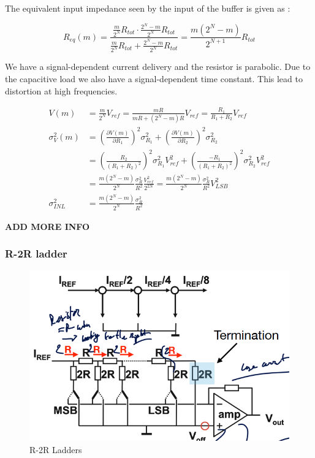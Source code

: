 \documentclass{report}
\begin{document}
The equivalent input impedance seen by the input of the buffer is given as :

\begin{equation}
    R_{eq} (m) = \frac{\frac{m}{2^N} R_{tot} \cdot \frac{2^N-m}{2^N} R_{tot} }{\frac{m}{2^N} R_{tot} + \frac{2^N-m}{2^N} R_{tot}} = \frac{m(2^N-m)}{2^{N+1}} R_{tot}
\end{equation}

We have a signal-dependent current delivery and the resistor is parabolic. Due to the capacitive load we also have a signal-dependent time constant. This lead to distortion at high frequencies.

\begin{align}
    V(m) &= \frac{m}{2^N} V_{ref} = \frac{mR}{mR + (2^N -m)R} V_{ref} = \frac{R_1}{R_1 + R_2} V_{ref}\\
    \sigma_{V}^2(m) &= \left( \frac{\partial V(m)}{\partial R_1} \right)^2 \sigma_{R_1}^2  + \left( \frac{\partial V(m)}{\partial R_2} \right)^2 \sigma_{R_2}^2 \\
    &= \left( \frac{R_2}{(R_1+R_2)^2} \right)^2 \sigma_{R_1}^2 V_{ref}^2  +  \left( \frac{-R_1}{(R_1+R_2)^2} \right)^2 \sigma_{R_2}^2 V_{ref}^2\\
    &= \frac{m(2^N -m)}{2^N} \frac{\sigma_R^2}{R^2} \frac{V_{ref}^2}{2^{2N}} =  \frac{m(2^N -m)}{2^N} \frac{\sigma_R^2}{R^2} V_{LSB}^2\\ 
    \sigma_{INL}^2 &= \frac{m(2^N- m)}{2^N} \frac{\sigma_R^2}{R^2}
\end{align}

\textbf{ADD MORE INFO}

\subsubsection{R-2R ladder}

\begin{figure}[H]
    \centering
    \includegraphics[width=0.75\linewidth]{img/R_2R.png}
    \caption{R-2R Ladders}
    \label{fig:R-2R-label}
\end{figure}
\end{document}
